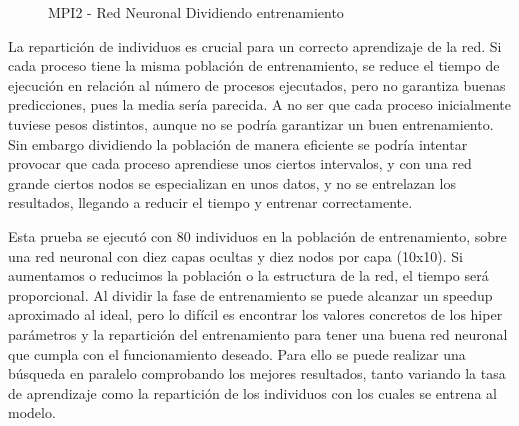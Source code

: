 			\begin{figure}[!h]
				\centering
				\caption{MPI2 - Red Neuronal Dividiendo entrenamiento}
				\label{fig:redneu_estrategia2}
			\end{figure}
			
			\newpage

			
			La repartición de individuos es crucial para un correcto aprendizaje de la red. Si cada proceso tiene la misma población de entrenamiento, se reduce el tiempo de ejecución en relación al número de procesos ejecutados, pero no garantiza buenas predicciones, pues la media sería parecida. A no ser que cada proceso inicialmente tuviese pesos distintos, aunque no se podría garantizar un buen entrenamiento. Sin embargo dividiendo la población de manera eficiente se podría intentar provocar que cada proceso aprendiese unos ciertos intervalos, y con una red grande ciertos nodos se especializan en unos datos, y no se entrelazan los resultados, llegando a reducir el tiempo y entrenar correctamente.
			
			
			
			Esta prueba se ejecutó con 80 individuos en la población de entrenamiento, sobre una red neuronal con diez capas ocultas y diez nodos por capa (10x10). Si aumentamos o reducimos la población o la estructura de la red, el tiempo será proporcional.
			Al dividir la fase de entrenamiento se puede alcanzar un speedup aproximado al ideal, pero lo difícil es encontrar los valores concretos de los hiper parámetros y la repartición del entrenamiento para tener una buena red neuronal que cumpla con el funcionamiento deseado. Para ello se puede realizar una búsqueda en paralelo comprobando los mejores resultados, tanto variando la tasa de aprendizaje como la repartición de los individuos con los cuales se entrena al modelo.
			
